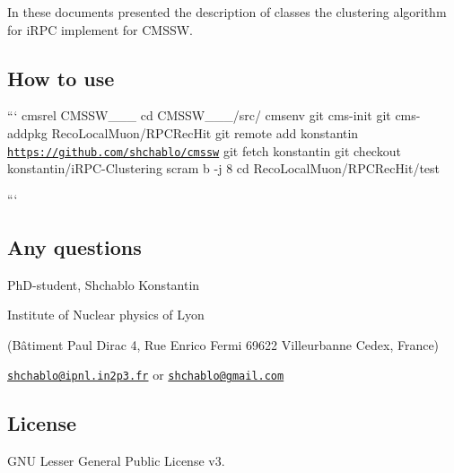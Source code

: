 In these documents presented the description of classes the clustering algorithm for i\-R\-P\-C implement for C\-M\-S\-S\-W.

\subsection*{How to use}

``` cmsrel C\-M\-S\-S\-W\-\_\-\_\-\_ cd C\-M\-S\-S\-W\-\_\-\_\-\_/src/ cmsenv git cms-\/init git cms-\/addpkg Reco\-Local\-Muon/\-R\-P\-C\-Rec\-Hit git remote add konstantin \href{https://github.com/shchablo/cmssw}{\tt https\-://github.\-com/shchablo/cmssw} git fetch konstantin git checkout konstantin/i\-R\-P\-C-\/\-Clustering scram b -\/j 8 cd Reco\-Local\-Muon/\-R\-P\-C\-Rec\-Hit/test

``` \subsection*{Any questions}

Ph\-D-\/student, Shchablo Konstantin \par
 Institute of Nuclear physics of Lyon \par
 (Bâtiment Paul Dirac 4, Rue Enrico Fermi 69622 Villeurbanne Cedex, France) \par
 \href{mailto:shchablo@ipnl.in2p3.fr}{\tt shchablo@ipnl.\-in2p3.\-fr} or \href{mailto:shchablo@gmail.com}{\tt shchablo@gmail.\-com}

\subsection*{License}

G\-N\-U Lesser General Public License v3. 